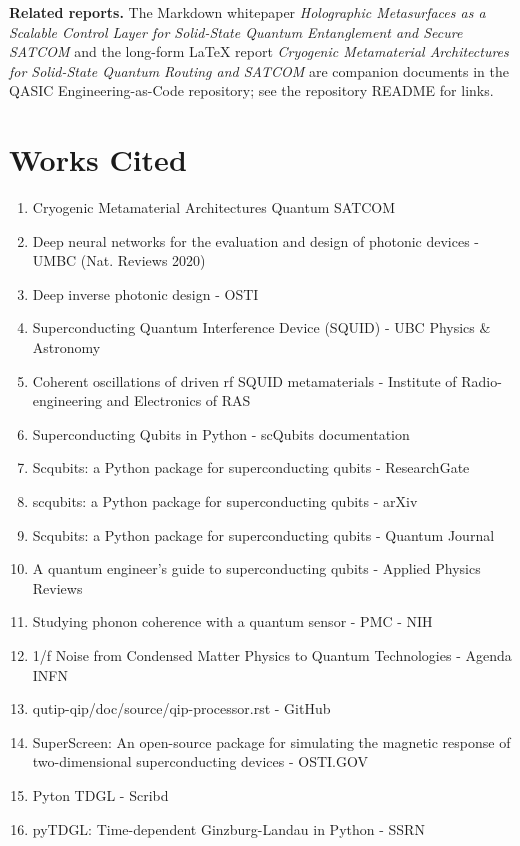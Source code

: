 \documentclass[11pt, a4paper]{article}
\begin{document}
\vspace{0.5em}
\noindent\textbf{Related reports.} The Markdown whitepaper \textit{Holographic Metasurfaces as a Scalable Control Layer for Solid-State Quantum Entanglement and Secure SATCOM} and the long-form LaTeX report \textit{Cryogenic Metamaterial Architectures for Solid-State Quantum Routing and SATCOM} are companion documents in the QASIC Engineering-as-Code repository; see the repository README for links.

\section*{Works Cited}
\begin{enumerate}
    \item Cryogenic Metamaterial Architectures Quantum SATCOM
    \item Deep neural networks for the evaluation and design of photonic devices - UMBC (Nat. Reviews 2020)
    \item Deep inverse photonic design - OSTI
    \item Superconducting Quantum Interference Device (SQUID) - UBC Physics \& Astronomy
    \item Coherent oscillations of driven rf SQUID metamaterials - Institute of Radio-engineering and Electronics of RAS
    \item Superconducting Qubits in Python - scQubits documentation
    \item Scqubits: a Python package for superconducting qubits - ResearchGate
    \item scqubits: a Python package for superconducting qubits - arXiv
    \item Scqubits: a Python package for superconducting qubits - Quantum Journal
    \item A quantum engineer's guide to superconducting qubits - Applied Physics Reviews
    \item Studying phonon coherence with a quantum sensor - PMC - NIH
    \item 1/f Noise from Condensed Matter Physics to Quantum Technologies - Agenda INFN
    \item qutip-qip/doc/source/qip-processor.rst - GitHub
    \item SuperScreen: An open-source package for simulating the magnetic response of two-dimensional superconducting devices - OSTI.GOV
    \item Pyton TDGL - Scribd
    \item pyTDGL: Time-dependent Ginzburg-Landau in Python - SSRN

\end{enumerate}
\end{document}
